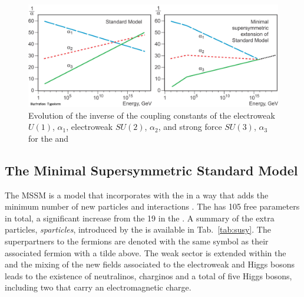 \begin{figure}
  \includegraphics[width=1.0\linewidth]{figs/runningCouplingSusy}
  \caption[]%
  {Evolution of the inverse of the coupling constants of the
  electroweak $U(1)$, $\alpha_1$, electroweak $SU(2)$, $\alpha_2$, and
  strong force $SU(3)$, $\alpha_3$ for the \SM and \MSSM \cite{runningCoupling}}%
  \label{fig:runningCoupling}
\end{figure}

\subsection{The Minimal Supersymmetric Standard Model}
\label{sec:MSSM}

The \acf{MSSM} is a model that incorporates \SUSY with the \SM in a
way that adds the minimum number of new particles and interactions
\cite{Csaki:1996ks}. The \MSSM has 105 free parameters in total, a
significant increase from the 19 in the \SM. A summary of the extra
particles, \emph{sparticles}, introduced by the \MSSM is available in Tab.~\ref{tab:susy}.
The superpartners to the fermions are denoted with the same symbol as
their associated fermion with a tilde above. The weak sector is
extended within the \MSSM and the mixing of the new \SUSY fields
associated to the electroweak and Higgs bosons leads to
the existence of neutralinos, charginos and a total of five Higgs
bosons, including two that carry an electromagnetic charge. 

